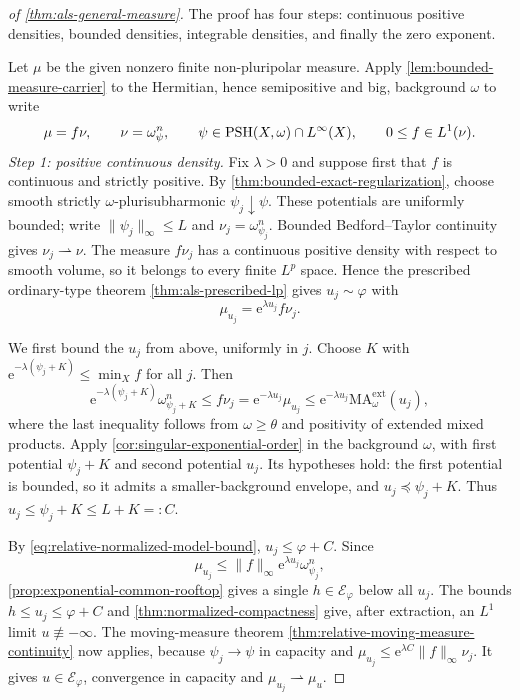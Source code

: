 \begin{proof}[of \cref{thm:als-general-measure}]
The proof has four steps: continuous positive densities, bounded densities, integrable densities, and finally the zero exponent.

Let $\mu$ be the given nonzero finite non-pluripolar measure. Apply \cref{lem:bounded-measure-carrier} to the Hermitian, hence semipositive and big, background $\omega$ to write
\[
 \mu=f\nu,\qquad \nu=\omega_\psi^n,\qquad
 \psi\in\mathrm{PSH}(X,\omega)\cap L^\infty(X),\qquad
 0\leq f\in L^1(\nu).
\]
\emph{Step 1: positive continuous density.} Fix $\lambda>0$ and suppose first that $f$ is continuous and strictly positive. By \cref{thm:bounded-exact-regularization}, choose smooth strictly $\omega$-plurisubharmonic $\psi_j\downarrow\psi$. These potentials are uniformly bounded; write $\|\psi_j\|_\infty\leq L$ and $\nu_j=\omega_{\psi_j}^n$. Bounded Bedford--Taylor continuity gives $\nu_j\rightharpoonup\nu$. The measure $f\nu_j$ has a continuous positive density with respect to smooth volume, so it belongs to every finite $L^p$ space. Hence the prescribed ordinary-type theorem \cref{thm:als-prescribed-lp} gives $u_j\sim\varphi$ with
\[
 \mu_{u_j}=\mathrm{e}^{\lambda u_j}f\nu_j.
\]

We first bound the $u_j$ from above, uniformly in $j$. Choose $K$ with
$\mathrm{e}^{-\lambda(\psi_j+K)}\leq\min_Xf$ for all $j$. Then
\[
 \mathrm{e}^{-\lambda(\psi_j+K)}\omega_{\psi_j+K}^n
 \leq f\nu_j
 =\mathrm{e}^{-\lambda u_j}\mu_{u_j}
 \leq \mathrm{e}^{-\lambda u_j}\mathrm{MA}^{\mathrm{ext}}_\omega(u_j),
\]
where the last inequality follows from $\omega\geq\theta$ and positivity of extended mixed products. Apply \cref{cor:singular-exponential-order} in the background $\omega$, with first potential $\psi_j+K$ and second potential $u_j$. Its hypotheses hold: the first potential is bounded, so it admits a smaller-background envelope, and $u_j\preceq\psi_j+K$. Thus $u_j\leq\psi_j+K\leq L+K=:C$.

By \eqref{eq:relative-normalized-model-bound}, $u_j\leq\varphi+C$. Since
\[
 \mu_{u_j}\leq\|f\|_\infty \mathrm{e}^{\lambda u_j}\omega_{\psi_j}^n,
\]
\cref{prop:exponential-common-rooftop} gives a single $h\in\mathcal E_\varphi$ below all $u_j$. The bounds $h\leq u_j\leq\varphi+C$ and \cref{thm:normalized-compactness} give, after extraction, an $L^1$ limit $u\not\equiv-\infty$. The moving-measure theorem \cref{thm:relative-moving-measure-continuity} now applies, because $\psi_j\to\psi$ in capacity and $\mu_{u_j}\leq \mathrm{e}^{\lambda C}\|f\|_\infty\nu_j$. It gives $u\in\mathcal E_\varphi$, convergence in capacity and $\mu_{u_j}\rightharpoonup\mu_u$.


\end{proof}
